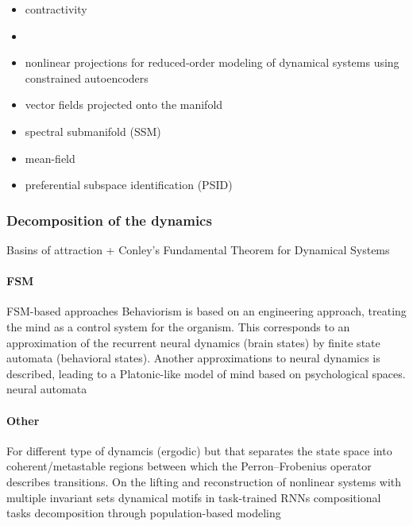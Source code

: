 \documentclass{article}
\theoremstyle{definition} \newtheorem{definition}{Definition}  \newtheorem{example}{Example}
\theoremstyle{remark} \newtheorem{remark}{Remark}
\newcounter{ct}
\begin{document}
\begin{itemize}
\item contractivity \citep{lohmiller1998contraction}\citep{bullo2023contraction} \citep{revay2020contracting} \citep{tsukamoto2021contraction} \citep{davydov2022rnn, davydov2024noneuclidean}
\item \citep{li2021novel}
\item nonlinear projections for reduced-order modeling of dynamical systems using constrained autoencoders\citep{otto2023learning}
\item vector fields projected onto the manifold \citep{roy2021extracting, luo2023noncanonical}
\item  spectral submanifold (SSM)\citep{cenedese2022data, axaas2023fast, bettini2024model, kaszas2024data}  \citep{pozzi2025topology}
\item mean-field\citep{bick2020understanding}
\item preferential subspace identification (PSID) \citep{sani2021modeling}
\end{itemize}

\subsubsection{Decomposition of the dynamics}\label{sec:decomposition}
Basins of attraction + Conley’s Fundamental Theorem for Dynamical Systems \citep{conley1978morse, norton1995fundamental,mischaikow1999cit}

\paragraph{FSM} FSM-based approaches\citep{pollack1991induction, casey1996dynamics, jacobsson2005ruleextraction, ashwin2021excitable, oliva2019fsm, cotteret2024fsm}
Behaviorism is based on an engineering approach, treating the mind as a control system for the organism.
This corresponds to an approximation of the recurrent neural dynamics (brain states) by finite state automata (behavioral states).
Another approximations to neural dynamics is described, leading to a Platonic-like model of mind based on psychological spaces. \citep{duch1998platonic}
%
neural automata\citep{goles2013neural, uria2024invariants}

\paragraph{Other}
For different type of dynamcis (ergodic) but that separates the state space into coherent/metastable regions between which the Perron–Frobenius operator describes transitions.
%
On the lifting and reconstruction of nonlinear systems with multiple invariant sets \citep{pan2024lifting}
%
dynamical motifs in task-trained RNNs \citep{driscoll2024flexible}
%
compositional tasks \citep{tafazoli2024building}
%
decomposition through population-based modeling\citep{glaser2020recurrent} 
%
\citep{mudrik2024decomposed}
\citep{yuste2024ensembles}
\end{document}
